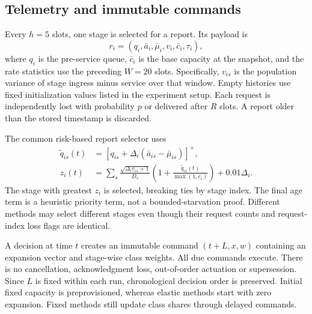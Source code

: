 \documentclass[10pt,a4paper]{article}
\newcommand{\pos}[1]{\left[#1\right]^+}
\begin{document}
\subsection{Telemetry and immutable commands}
Every $h=5$ slots, one stage is selected for a report. Its payload is
\begin{equation}
 r_i=(q_i,\bar a_i,\bar\mu_i,v_i,\bar c_i,\tau_i),
\end{equation}
where $q_i$ is the pre-service queue, $\bar c_i$ is the base capacity at the
snapshot, and the rate statistics use the preceding $W=20$ slots.
Specifically, $v_{is}$ is the population variance of stage ingress minus service
over that window. Empty histories use fixed initialization values listed in the
experiment setup. Each request is independently lost with probability $p$ or
delivered after $R$ slots. A report older than the stored timestamp is discarded.

The common risk-based report selector uses
\begin{align}
 \widetilde q_{is}(t)&=\pos{q_{is}+\Delta_i(\bar a_{is}-\bar\mu_{is})},\\
 z_i(t)&=\sum_s\frac{\sqrt{\Delta_i v_{is}+1}}{D_s}
 \left(1+\frac{\widetilde q_{is}(t)}{\max(1,\bar c_i)}\right)+0.01\Delta_i.
\end{align}
The stage with greatest $z_i$ is selected, breaking ties by stage index.
The final age term is a heuristic priority term, not a bounded-starvation proof.
Different methods may select different stages even though their request counts
and request-index loss flags are identical.

A decision at time $t$ creates an immutable command $(t+L,x,w)$ containing an
expansion vector and stage-wise class weights. All due commands execute. There
is no cancellation, acknowledgment loss, out-of-order actuation or supersession.
Since $L$ is fixed within each run, chronological decision order is preserved.
Initial fixed capacity is preprovisioned, whereas elastic methods start with
zero expansion. Fixed methods still update class shares through delayed commands.
\end{document}
